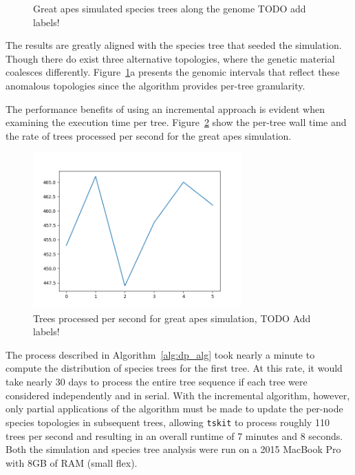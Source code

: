 \documentclass{article}
\newcommand{\tskit}{{\texttt{tskit}}}
\begin{document}
\begin{figure}[H]
\begin{minipage}{.48\textwidth}
\begin{minipage}{.4\textwidth}
\begin{subfigure}[b]{\linewidth}
            \end{subfigure}
        \end{minipage}
        \centering
    \end{minipage}
    \centering
    \caption{Great apes simulated species trees along the genome TODO add labels!}
    \label{fig:great_apes}
\end{figure}

The results are greatly aligned with the species tree that seeded the
simulation. Though there do exist three alternative topologies, where the
genetic material coalesces differently. Figure~\ref{fig:great_apes}a presents
the genomic intervals that reflect these anomalous topologies since the algorithm
provides per-tree granularity.

The performance benefits of using an incremental approach is evident when
examining the execution time per tree. Figure~\ref{fig:incremental_times}
show the per-tree wall time and the rate of trees processed per second
for the great apes simulation.
\begin{figure}[H]
    \includegraphics[height=6cm]{trees_per_sec.png}
    \centering
    \caption{Trees processed per second for great apes simulation, TODO Add labels!}
    \label{fig:incremental_times}
\end{figure}

The process described in Algorithm~\ref{alg:dp_alg}
took nearly a minute to compute the distribution of species trees for the first tree.
At this rate, it would take nearly 30 days to process the entire tree sequence if
each tree were considered independently and in serial.
With the incremental algorithm, however, only partial applications of the algorithm
must be made to update the per-node species topologies in subsequent trees, allowing
\tskit{} to process roughly 110 trees per second and resulting in an overall
runtime of 7 minutes and 8 seconds. Both the simulation and species tree analysis
were run on a 2015 MacBook Pro with 8GB of RAM (small flex).
\end{document}

